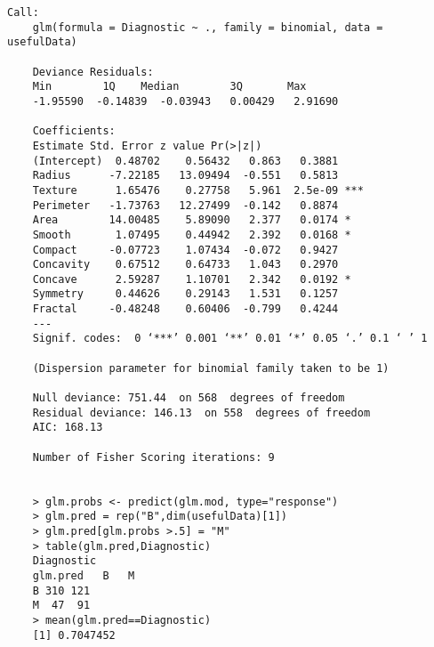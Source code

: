 \documentclass[12pt]{article}
\begin{document}
	\begin{lstlisting}[breaklines=true]
	Call:
	glm(formula = Diagnostic ~ ., family = binomial, data = usefulData)
	
	Deviance Residuals: 
	Min        1Q    Median        3Q       Max  
	-1.95590  -0.14839  -0.03943   0.00429   2.91690  
	
	Coefficients:
	Estimate Std. Error z value Pr(>|z|)    
	(Intercept)  0.48702    0.56432   0.863   0.3881    
	Radius      -7.22185   13.09494  -0.551   0.5813    
	Texture      1.65476    0.27758   5.961  2.5e-09 ***
	Perimeter   -1.73763   12.27499  -0.142   0.8874    
	Area        14.00485    5.89090   2.377   0.0174 *  
	Smooth       1.07495    0.44942   2.392   0.0168 *  
	Compact     -0.07723    1.07434  -0.072   0.9427    
	Concavity    0.67512    0.64733   1.043   0.2970    
	Concave      2.59287    1.10701   2.342   0.0192 *  
	Symmetry     0.44626    0.29143   1.531   0.1257    
	Fractal     -0.48248    0.60406  -0.799   0.4244    
	---
	Signif. codes:  0 ‘***’ 0.001 ‘**’ 0.01 ‘*’ 0.05 ‘.’ 0.1 ‘ ’ 1
	
	(Dispersion parameter for binomial family taken to be 1)
	
	Null deviance: 751.44  on 568  degrees of freedom
	Residual deviance: 146.13  on 558  degrees of freedom
	AIC: 168.13
	
	Number of Fisher Scoring iterations: 9
	
	
	> glm.probs <- predict(glm.mod, type="response")
	> glm.pred = rep("B",dim(usefulData)[1])
	> glm.pred[glm.probs >.5] = "M"
	> table(glm.pred,Diagnostic)
	Diagnostic
	glm.pred   B   M
	B 310 121
	M  47  91
	> mean(glm.pred==Diagnostic)
	[1] 0.7047452
	\end{lstlisting}
\end{document}
